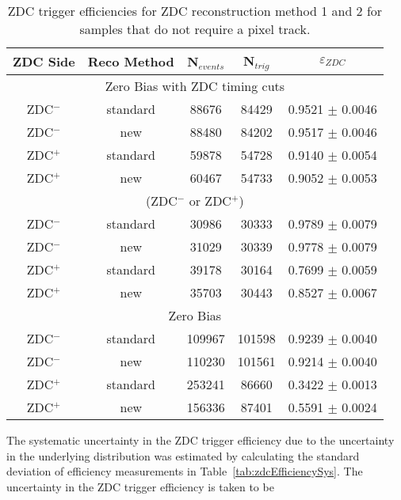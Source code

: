       \begin{table}
        \centering
        \begin{tabular}{|c|c|c|c|c|}
          \hline ZDC Side & Reco Method & N$_{events}$ & N$_{trig}$ & $\varepsilon_{ZDC}$ \\ \hline
          \multicolumn{5}{|c|}{ Zero Bias with ZDC timing cuts} \\ \hline 
           ZDC$^{-}$ & standard & 88676  & 84429  & 0.9521 $\pm$ 0.0046 \\ \hline
           ZDC$^{-}$ & new & 88480  & 84202  & 0.9517 $\pm$ 0.0046 \\ \hline
           ZDC$^{+}$ & standard & 59878  & 54728  & 0.9140  $\pm$ 0.0054 \\ \hline
           ZDC$^{+}$ & new & 60467  & 54733  & 0.9052  $\pm$ 0.0053 \\ \hline
           \multicolumn{5}{|c|}{(ZDC$^{-}$ or ZDC$^{+}$)} \\ \hline 
           ZDC$^{-}$ & standard & 30986 & 30333 & 0.9789 $\pm$ 0.0079 \\ \hline
           ZDC$^{-}$ & new & 31029 & 30339 & 0.9778 $\pm$ 0.0079 \\ \hline
           ZDC$^{+}$ & standard & 39178 & 30164 & 0.7699 $\pm$ 0.0059 \\ \hline
           ZDC$^{+}$ & new & 35703 & 30443 & 0.8527 $\pm$ 0.0067 \\ \hline
           \multicolumn{5}{|c|}{ Zero Bias} \\ \hline 
           ZDC$^{-}$ & standard & 109967  & 101598  & 0.9239 $\pm$ 0.0040 \\ \hline
           ZDC$^{-}$ & new & 110230  & 101561  & 0.9214 $\pm$ 0.0040 \\ \hline
           ZDC$^{+}$ & standard & 253241  & 86660  & 0.3422 $\pm$ 0.0013 \\ \hline
           ZDC$^{+}$ & new & 156336  & 87401  & 0.5591 $\pm$ 0.0024 \\ \hline
         \end{tabular}
        \caption{ZDC trigger efficiencies for ZDC reconstruction method 1 and 
          2 for samples that do not require a pixel track.}
        \label{tab:zdcEfficiencySysNoiseSample}
      \end{table}

      The systematic uncertainty in the ZDC trigger efficiency due to the 
        uncertainty in the underlying distribution was estimated by calculating 
        the standard deviation of efficiency measurements in Table~\ref{tab:zdcEfficiencySys}.
      The uncertainty in the ZDC trigger efficiency is taken to be  

